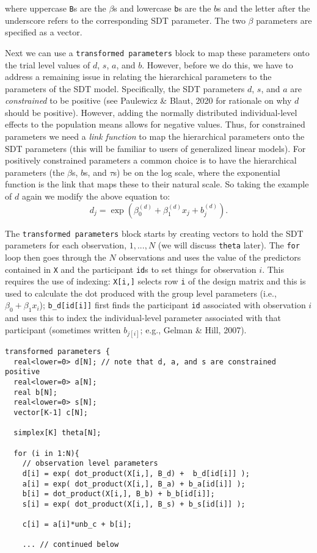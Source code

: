 \documentclass[
  english,
  ,man,floatsintext]{apa6}
\begin{document}
where uppercase \texttt{B}s are the \(\beta\)s and lowercase \texttt{b}s are the \(b\)s and the letter after the underscore refers to the corresponding SDT parameter. The two \(\beta\) parameters are specified as a vector.

Next we can use a \texttt{transformed\ parameters} block to map these parameters onto the trial level values of \(d\), \(s\), \(a\), and \(b\). However, before we do this, we have to address a remaining issue in relating the hierarchical parameters to the parameters of the SDT model. Specifically, the SDT parameters \(d\), \(s\), and \(a\) are \emph{constrained} to be positive (see Paulewicz \& Blaut, 2020 for rationale on why \(d\) should be positive). However, adding the normally distributed individual-level effects to the population means allows for negative values. Thus, for constrained parameters we need a \emph{link function} to map the hierarchical parameters onto the SDT parameters (this will be familiar to users of generalized linear models). For positively constrained parameters a common choice is to have the hierarchical parameters (the \(\beta\)s, \(b\)s, and \(\tau\)s) be on the log scale, where the exponential function is the link that maps these to their natural scale. So taking the example of \(d\) again we modify the above equation to:
\[
d_{j} = \exp\left(\beta_{0}^{(d)} + \beta_{1}^{(d)}x_j + b^{(d)}_{j}\right).
\]

The \texttt{transformed\ parameters} block starts by creating vectors to hold the SDT parameters for each observation, \(1,...,N\) (we will discuss \texttt{theta} later). The \texttt{for} loop then goes through the \(N\) observations and uses the value of the predictors contained in \texttt{X} and the participant \texttt{id}s to set things for observation \(i\). This requires the use of indexing: \texttt{X{[}i,{]}} selects row \texttt{i} of the design matrix and this is used to calculate the dot produced with the group level parameters (i.e., \(\beta_0 + \beta_1x_i\)); \texttt{b\_d{[}id{[}i{]}{]}} first finds the participant \texttt{id} associated with observation \(i\) and uses this to index the individual-level parameter associated with that participant (sometimes written \(b_{j[i]}\); e.g., Gelman \& Hill, 2007).

\begin{verbatim}
transformed parameters {
  real<lower=0> d[N]; // note that d, a, and s are constrained positive
  real<lower=0> a[N]; 
  real b[N];
  real<lower=0> s[N];
  vector[K-1] c[N];
  
  simplex[K] theta[N];
  
  for (i in 1:N){
    // observation level parameters
    d[i] = exp( dot_product(X[i,], B_d) +  b_d[id[i]] );
    a[i] = exp( dot_product(X[i,], B_a) + b_a[id[i]] );
    b[i] = dot_product(X[i,], B_b) + b_b[id[i]];
    s[i] = exp( dot_product(X[i,], B_s) + b_s[id[i]] );
    
    c[i] = a[i]*unb_c + b[i];
    
    ... // continued below
\end{verbatim}
\end{document}
